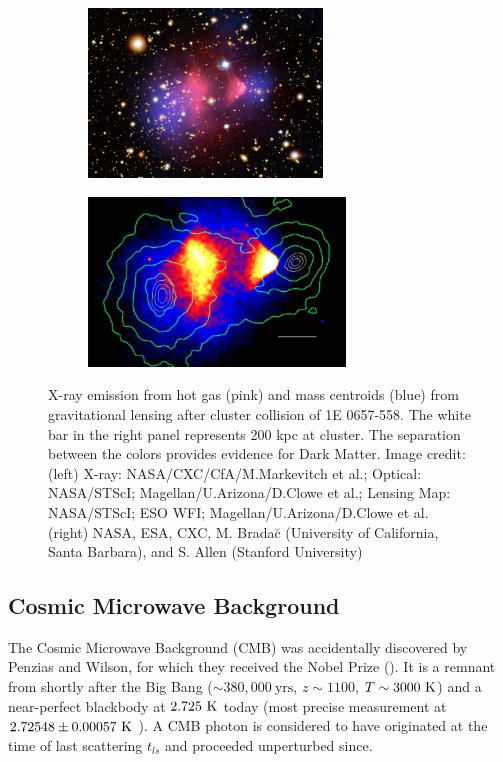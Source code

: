 \begin{figure}
    \centering
    \begin{subfigure}[t]{0.45\textwidth}
        \centering
        \includegraphics[height=4.5cm]{chandra_bullett_preview}
    \end{subfigure}%
    \begin{subfigure}[t]{0.45\textwidth}
        \centering
        \includegraphics[height=4.5cm]{bullet_cluster_paper}
    \end{subfigure}
    \caption{X-ray emission from hot gas (pink) and mass centroids (blue) from gravitational lensing after cluster
	collision of 1E 0657-558.  The white bar in the right panel represents 200 kpc at cluster.  The separation
	between the colors provides evidence for Dark Matter.
	Image credit: (left) X-ray: NASA/CXC/CfA/M.Markevitch et al.; Optical: NASA/STScI; Magellan/U.Arizona/D.Clowe et al.;
	Lensing Map: NASA/STScI; ESO WFI; Magellan/U.Arizona/D.Clowe et al. (right) NASA, ESA, CXC, M. Brada\u{c}
	(University of California, Santa Barbara), and S. Allen (Stanford University)}
	\label{fig:bullet_cluster}
\end{figure}




\subsection{Cosmic Microwave Background} \label{subsec:cmb}
The Cosmic Microwave Background (CMB) was accidentally discovered by Penzias and Wilson, for which they received
the Nobel Prize ().  It
is a remnant from shortly after the Big Bang ($\sim380,000\ \mathrm{yrs}$, $z\sim1100$, $T\sim3000\ \mathrm{K}$) and a near-perfect
blackbody at $2.725\ \mathrm{K}$ today (most precise measurement at $2.72548 \pm 0.00057\ \mathrm{K}$ ).  A CMB
photon is considered to have originated at the time of last scattering $t_{ls}$ and proceeded unperturbed since.

